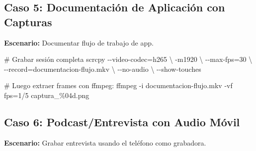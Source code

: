 \documentclass[
  doc,
  floatsintext,
  longtable,
  a4paper,
  nolmodern,
  notxfonts,
  notimes,
  12pt,
  colorlinks=true,linkcolor=blue,citecolor=blue,urlcolor=blue]{apa7}
\newenvironment{Shaded}{\begin{snugshade}}{\end{snugshade}}
\newcommand{\AttributeTok}[1]{\textcolor[rgb]{0.40,0.45,0.13}{#1}}
\newcommand{\CommentTok}[1]{\textcolor[rgb]{0.37,0.37,0.37}{#1}}
\newcommand{\DataTypeTok}[1]{\textcolor[rgb]{0.68,0.00,0.00}{#1}}
\newcommand{\ExtensionTok}[1]{\textcolor[rgb]{0.00,0.23,0.31}{#1}}
\newcommand{\FunctionTok}[1]{\textcolor[rgb]{0.28,0.35,0.67}{#1}}
\newcommand{\NormalTok}[1]{\textcolor[rgb]{0.00,0.23,0.31}{#1}}
\newcommand{\OperatorTok}[1]{\textcolor[rgb]{0.37,0.37,0.37}{#1}}
\newcommand{\VariableTok}[1]{\textcolor[rgb]{0.07,0.07,0.07}{#1}}
\begin{document}
\subsection{Caso 5: Documentación de Aplicación con
Capturas}\label{caso-5-documentaciuxf3n-de-aplicaciuxf3n-con-capturas}

\textbf{Escenario:} Documentar flujo de trabajo de app.

\begin{Shaded}
\begin{Highlighting}[]
\CommentTok{\# Grabar sesión completa}
\ExtensionTok{scrcpy} \AttributeTok{{-}{-}video{-}codec}\OperatorTok{=}\NormalTok{h265 }\DataTypeTok{\textbackslash{}}
  \AttributeTok{{-}m1920} \DataTypeTok{\textbackslash{}}
  \AttributeTok{{-}{-}max{-}fps}\OperatorTok{=}\NormalTok{30 }\DataTypeTok{\textbackslash{}}
  \AttributeTok{{-}{-}record}\OperatorTok{=}\NormalTok{documentacion{-}flujo.mkv }\DataTypeTok{\textbackslash{}}
  \AttributeTok{{-}{-}no{-}audio} \DataTypeTok{\textbackslash{}}
  \AttributeTok{{-}{-}show{-}touches}

\CommentTok{\# Luego extraer frames con ffmpeg:}
\ExtensionTok{ffmpeg} \AttributeTok{{-}i}\NormalTok{ documentacion{-}flujo.mkv }\AttributeTok{{-}vf}\NormalTok{ fps=1/5 captura\_\%04d.png}
\end{Highlighting}
\end{Shaded}

\subsection{Caso 6: Podcast/Entrevista con Audio
Móvil}\label{caso-6-podcastentrevista-con-audio-muxf3vil}

\textbf{Escenario:} Grabar entrevista usando el teléfono como grabadora.

\begin{Shaded}
\end{Shaded}
\end{document}
